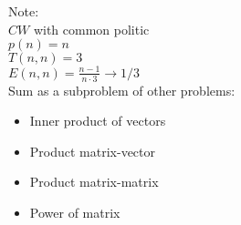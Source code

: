 Note:\\
$CW$ with common politic\\
$p(n) = n$\\
$T(n, n) = 3$\\
$E(n, n) = \frac{n-1}{n \cdot 3} \rightarrow 1/3$\\

Sum as a subproblem of other problems:
\begin{itemize}
 \item Inner product of vectors
 \item Product matrix-vector
 \item Product matrix-matrix
 \item Power of matrix
\end{itemize}


